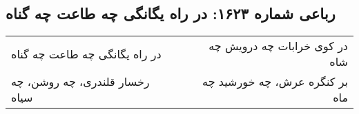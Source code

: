\begin{center}
\section*{رباعی شماره ۱۶۲۳: در راه یگانگی چه طاعت چه گناه}
\label{sec:1623}
\begin{longtable}{l p{0.5cm} r}
در راه یگانگی چه طاعت چه گناه
&&
در کوی خرابات چه درویش چه شاه
\\
رخسار قلندری، چه روشن، چه سیاه
&&
بر کنگره عرش، چه خورشید چه ماه
\\
\end{longtable}
\end{center}
